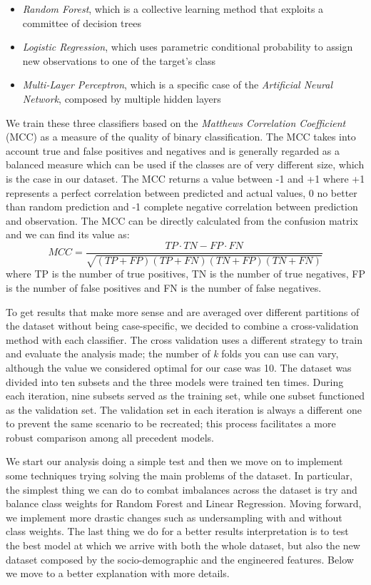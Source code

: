 \documentclass[a4paper,11pt]{article}
\begin{document}
\begin{itemize}
	\item \textit{Random Forest}, which is a collective learning method that exploits a committee of decision trees
	\item \textit{Logistic Regression}, which uses parametric conditional probability to assign new observations to one of the target’s class
	\item \textit{Multi-Layer Perceptron}, which is a specific case of the \textit{Artificial Neural Network}, composed by multiple hidden layers
\end{itemize}

We train these three classifiers based on the \textit{Matthews Correlation Coefficient} (MCC) \cite{BioData} \cite{BMC} as a measure of the quality of binary classification. The MCC takes into account true and false positives and negatives and is generally regarded as a balanced measure which can be used if the classes are of very different size, which is the case in our dataset. The MCC returns a value between -1 and +1 where +1 represents a perfect correlation between predicted and actual values, 0 no better than random prediction and -1 complete negative correlation between prediction and observation. 
The MCC can be directly calculated from the confusion matrix and we can find its value as:
\begin{equation}
	MCC = \frac{TP \cdot TN - FP \cdot FN}{\sqrt{(TP+FP)(TP+FN)(TN+FP)(TN+FN)}}
\end{equation}
where TP is the number of true positives, TN is the number of true negatives, FP is the number of false positives and FN is the number of false negatives. 

To get results that make more sense and are averaged over different partitions of the dataset without being case-specific, we decided to combine a cross-validation method with each classifier. The cross validation uses a different strategy to train and evaluate the analysis made; the number of \textit{k} folds you can use can vary, although the value we considered optimal for our case was 10. The dataset was divided into ten subsets and the three models were trained ten times. During each iteration, nine subsets served as the training set, while one subset functioned as the validation set. The validation set in each iteration is always a different one to prevent the same scenario to be recreated; this process facilitates a more robust comparison among all precedent models. 

We start our analysis doing a simple test and then we move on to implement some techniques trying solving the main problems of the dataset. In particular, the simplest thing we can do to combat imbalances across the dataset is try and balance class weights for Random Forest and Linear Regression. Moving forward, we implement more drastic changes such as undersampling with and without class weights. The last thing we do for a better results interpretation is to test the best model at which we arrive with both the whole dataset, but also the new dataset composed by the socio-demographic and the engineered features. Below we move to a better explanation with more details.
\end{document}
